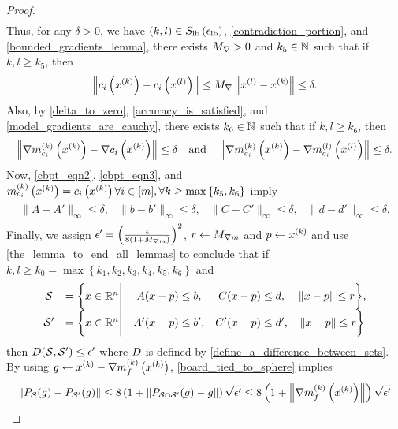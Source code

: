 \begin{proof}
\begin{align*}
\end{align*}
Thus, for any $\delta > 0$, we have
$(k, l) \in {S_{\textrm{lb}}\left(\epsilon_{\textrm{lb}}\right)}$, \cref{contradiction_portion}, and
\cref{bounded_gradients_lemma}, there exists ${M_{\nabla}} > 0$ and $k_5 \in \mathbb N$ such that if $k, l \ge k_5$, 
then
\begin{align}
\left\|c_i\left(x^{(k)}\right) - c_i\left({x^{(l)}}\right) \right\| \le {M_{\nabla}} \left\|{x^{(l)}} - x^{(k)}\right\| \le \delta. \label{cbpt_eqn2}
\end{align}
Also, by \cref{delta_to_zero}, \cref{accuracy_is_satisfied}, and \cref{model_gradients_are_cauchy}, 
there exists $k_6 \in \mathbb N$ such that if $k, l \ge k_6$, then
\begin{align}
\left\|{\nabla m_{c_i}^{(k)}\left(x^{(k)}\right)} - \nabla c_i\left(x^{(k)}\right)\right\| \le \delta \quad \textrm{and} \quad
\left\|{\nabla m_{c_i}^{(k)}\left(x^{(k)}\right)} - {\nabla m_{c_i}^{(l)}\left({x^{(l)}}\right)}\right\| \le \delta. \label{cbpt_eqn3}
\end{align}
Now, \cref{cbpt_eqn2}, \cref{cbpt_eqn3}, and $m_{c_i}^{(k)}\left(x^{(k)}\right) = c_i\left(x^{(k)}\right) \forall i \in[m], \forall k \ge \max\left\{k_5, k_6\right\}$ imply
\begin{align*}
\begin{array}{cccc}
\|A - A'\|_{\infty} \le \delta,	& \|b - b'\|_{\infty} \le \delta,		& \|C - C'\|_{\infty} \le \delta,	& \|d - d'\|_{\infty} \le \delta.
\end{array}
\end{align*}
Finally, we assign $\epsilon' = \left(\frac {\epsilon}{8\left(1 + {M_{\nabla m}}\right)}\right)^2$,
$r \gets {M_{\nabla m}}$ and $p \gets x^{(k)}$ and use \cref{the_lemma_to_end_all_lemmas}
to conclude that if $k, l \ge k_0 = \max\left\{k_1, k_2, k_3, k_4, k_5, k_6\right\}$ and
\begin{align*}
\begin{array}{ccccc}
\mathcal S  &= \bigg\{x \in \mathbb R^n \bigg|& A (x - p) \le b ,& C (x - p) \le d ,& \|x - p\| \le r \bigg\}, \\
\mathcal S' &= \bigg\{x \in \mathbb R^n \bigg|& A'(x - p) \le b',& C'(x - p) \le d',& \|x - p\| \le r \bigg\}
\end{array}
\end{align*}
then ${D}(\mathcal S, \mathcal S') \le \epsilon'$ where ${D}$ is defined by \cref{define_a_difference_between_sets}.
By using $g \gets x^{(k)} - {\nabla m_f^{(k)}\left(x^{(k)}\right)}$, \cref{board_tied_to_sphere} implies
\begin{align*}
\left\|P_{\mathcal S}(g) - P_{\mathcal S'}(g)\right\| 
\le 8\left(1 + \left\|P_{\mathcal S \cap \mathcal S'}(g) - g\right\|\right) \sqrt{\epsilon'} 
\le 8\left(1 + \left\|\gk\right\|\right) \sqrt{\epsilon'} 

\end{align*}
\end{proof}
